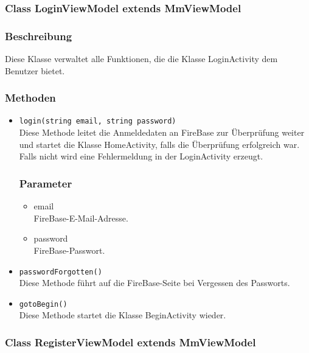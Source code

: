 \documentclass[a4paper]{scrreprt}
\begin{document}

\subsubsection{Class LoginViewModel extends MmViewModel}
\subsubsection*{Beschreibung}
Diese Klasse verwaltet alle Funktionen, die die Klasse LoginActivity dem Benutzer bietet.

\subsubsection*{Methoden}
\begin{addmargin}[25pt]{0pt}
\begin{itemize}

\item \texttt{login(string email, string password)}\\
	Diese Methode leitet die Anmeldedaten an FireBase zur Überprüfung weiter und startet die Klasse HomeActivity, falls die Überprüfung erfolgreich war. Falls nicht wird eine Fehlermeldung in der LoginActivity erzeugt.
	\subsubsection*{Parameter}
	\begin{itemize}
	\item email \\
		FireBase-E-Mail-Adresse.
	\item password \\
		FireBase-Passwort.
	\end{itemize}

\item \texttt{passwordForgotten()}\\
	Diese Methode führt auf die FireBase-Seite bei Vergessen des Passworts.

\item \texttt{gotoBegin()}\\
	Diese Methode startet die Klasse BeginActivity wieder.

\end{itemize}
\end{addmargin}	



\subsubsection{Class RegisterViewModel extends MmViewModel}
\end{document}
